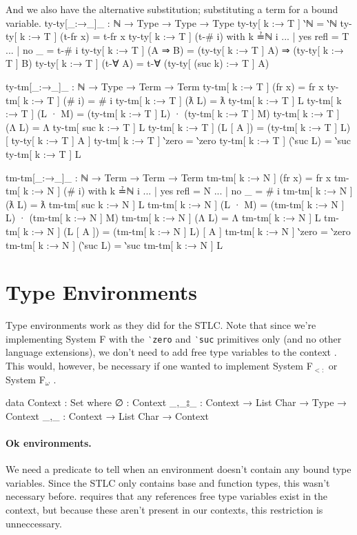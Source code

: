 \documentclass[logo,bsc,singlespacing,parskip,online]{infthesis}
\renewenvironment{code}{\mintedcopy[breaklines,breaksymbolleft=\;]{agda}}{\endmintedcopy}
\begin{document}
And we also have the alternative substitution; substituting a term for a bound variable.
\begin{code}
  ty-ty[_:→_]_ : ℕ → Type → Type → Type
  ty-ty[ k :→ T ] ‵ℕ = ‵ℕ
  ty-ty[ k :→ T ] (t-fr x) = t-fr x
  ty-ty[ k :→ T ] (t-# i) with k ≟ℕ i
  ... | yes refl = T
  ... | no  _    = t-# i
  ty-ty[ k :→ T ] (A ⇒ B) = (ty-ty[ k :→ T ] A) ⇒ (ty-ty[ k :→ T ] B)
  ty-ty[ k :→ T ] (t-∀ A) = t-∀ (ty-ty[ (suc k) :→ T ] A)

  ty-tm[_:→_]_ : ℕ → Type → Term → Term
  ty-tm[ k :→ T ] (fr x) = fr x
  ty-tm[ k :→ T ] (# i) = # i
  ty-tm[ k :→ T ] (ƛ L) = ƛ ty-tm[ k :→ T ] L
  ty-tm[ k :→ T ] (L · M) = (ty-tm[ k :→ T ] L) · (ty-tm[ k :→ T ] M)
  ty-tm[ k :→ T ] (Λ L) = Λ ty-tm[ suc k :→ T ] L
  ty-tm[ k :→ T ] (L [ A ]) = (ty-tm[ k :→ T ] L) [ ty-ty[ k :→ T ] A ]
  ty-tm[ k :→ T ] ‵zero = ‵zero
  ty-tm[ k :→ T ] (‵suc L) = ‵suc ty-tm[ k :→ T ] L

  tm-tm[_:→_]_ : ℕ → Term → Term → Term
  tm-tm[ k :→ N ] (fr x) = fr x
  tm-tm[ k :→ N ] (# i) with k ≟ℕ i
  ... | yes refl = N
  ... | no  _    = # i
  tm-tm[ k :→ N ] (ƛ L) = ƛ tm-tm[ suc k :→ N ] L
  tm-tm[ k :→ N ] (L · M) = (tm-tm[ k :→ N ] L) · (tm-tm[ k :→ N ] M)
  tm-tm[ k :→ N ] (Λ L) = Λ tm-tm[ k :→ N ] L
  tm-tm[ k :→ N ] (L [ A ]) = (tm-tm[ k :→ N ] L) [ A ]
  tm-tm[ k :→ N ] ‵zero = ‵zero
  tm-tm[ k :→ N ] (‵suc L) = ‵suc tm-tm[ k :→ N ] L
\end{code}

\section{Type Environments}
Type environments work as they did for the STLC. Note that since we're implementing System F with
the \texttt{‵zero} and \texttt{‵suc} primitives only (and no other language extensions), we don't
need to add free type variables to the context \citep{pierce_types_2002}. This would, however, be
necessary if one wanted to implement System F$_{<:}$ \citep{chargueraud_locally_2012} or System
F$_{\omega}$ \citep{hutton_system_2019}.

\begin{code}
  data Context : Set where
    ∅ : Context
    _,_⦂_ : Context → List Char → Type → Context
    _,_ : Context → List Char → Context
\end{code}

\paragraph*{Ok environments.} We need a predicate to tell when an environment doesn't contain any
bound type variables. Since the STLC only contains base and function types, this wasn't necessary
before. \citet{chargueraud_locally_2012} requires that any references free type variables
exist in the context, but because these aren't present in our contexts, this
restriction is unneccessary.
\end{document}
